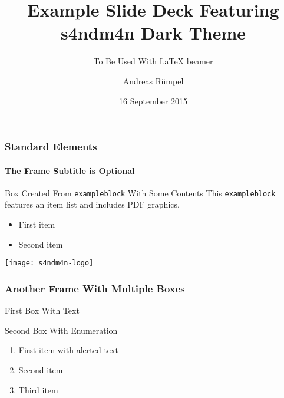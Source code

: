 \documentclass[aspectratio=1610]{beamer}
\title{Example Slide Deck Featuring s4ndm4n Dark Theme}
\subtitle{To Be Used With \LaTeX{} beamer}
\author{Andreas Rümpel}
\institute{s4ndm4n powered by andreasruempel.de}
\date[2015-09-16]{16 September 2015}
\begin{document}
\maketitle

\begin{frame}
	\frametitle{Standard Elements}
	\framesubtitle{The Frame Subtitle is Optional}
	\begin{exampleblock}{Box Created From \texttt{exampleblock} With Some Contents}
		This \texttt{exampleblock} features an item list and includes PDF graphics.
		\begin{itemize}
			\item First item
			\item Second item
		\end{itemize}
		\centering
		\texttt{[image: s4ndm4n-logo]}
	\end{exampleblock}
\end{frame}


\begin{frame}
	\frametitle{Another Frame With Multiple Boxes}
	\begin{exampleblock}{First Box With Text}
		\lipsum[4]
	\end{exampleblock}
	
	\begin{exampleblock}{Second Box With Enumeration}
		\begin{enumerate}
			\item First item with \alert{alerted text}
			\item Second item
			\item Third item
		\end{enumerate}
		\end{exampleblock}
\end{frame}
\end{document}
